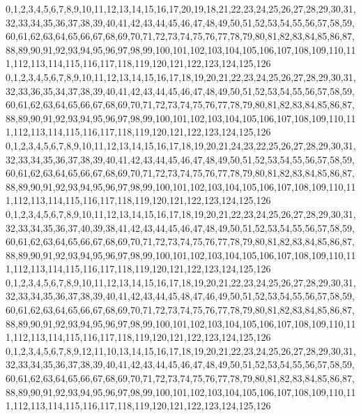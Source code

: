 \documentclass[12pt]{article}
\begin{document}
{0,1,2,3,4,5,6,7,8,9,10,11,12,13,14,15,16,17,20,19,18,21,22,23,24,25,26,27,28,29,30,31,32,33,34,35,36,37,38,39,40,41,42,43,44,45,46,47,48,49,50,51,52,53,54,55,56,57,58,59,60,61,62,63,64,65,66,67,68,69,70,71,72,73,74,75,76,77,78,79,80,81,82,83,84,85,86,87,88,89,90,91,92,93,94,95,96,97,98,99,100,101,102,103,104,105,106,107,108,109,110,111,112,113,114,115,116,117,118,119,120,121,122,123,124,125,126\\
0,1,2,3,4,5,6,7,8,9,10,11,12,13,14,15,16,17,18,19,20,21,22,23,24,25,26,27,28,29,30,31,32,33,36,35,34,37,38,39,40,41,42,43,44,45,46,47,48,49,50,51,52,53,54,55,56,57,58,59,60,61,62,63,64,65,66,67,68,69,70,71,72,73,74,75,76,77,78,79,80,81,82,83,84,85,86,87,88,89,90,91,92,93,94,95,96,97,98,99,100,101,102,103,104,105,106,107,108,109,110,111,112,113,114,115,116,117,118,119,120,121,122,123,124,125,126\\
0,1,2,3,4,5,6,7,8,9,10,11,12,13,14,15,16,17,18,19,20,21,24,23,22,25,26,27,28,29,30,31,32,33,34,35,36,37,38,39,40,41,42,43,44,45,46,47,48,49,50,51,52,53,54,55,56,57,58,59,60,61,62,63,64,65,66,67,68,69,70,71,72,73,74,75,76,77,78,79,80,81,82,83,84,85,86,87,88,89,90,91,92,93,94,95,96,97,98,99,100,101,102,103,104,105,106,107,108,109,110,111,112,113,114,115,116,117,118,119,120,121,122,123,124,125,126\\
0,1,2,3,4,5,6,7,8,9,10,11,12,13,14,15,16,17,18,19,20,21,22,23,24,25,26,27,28,29,30,31,32,33,34,35,36,37,40,39,38,41,42,43,44,45,46,47,48,49,50,51,52,53,54,55,56,57,58,59,60,61,62,63,64,65,66,67,68,69,70,71,72,73,74,75,76,77,78,79,80,81,82,83,84,85,86,87,88,89,90,91,92,93,94,95,96,97,98,99,100,101,102,103,104,105,106,107,108,109,110,111,112,113,114,115,116,117,118,119,120,121,122,123,124,125,126\\
0,1,2,3,4,5,6,7,8,9,10,11,12,13,14,15,16,17,18,19,20,21,22,23,24,25,26,27,28,29,30,31,32,33,34,35,36,37,38,39,40,41,42,43,44,45,48,47,46,49,50,51,52,53,54,55,56,57,58,59,60,61,62,63,64,65,66,67,68,69,70,71,72,73,74,75,76,77,78,79,80,81,82,83,84,85,86,87,88,89,90,91,92,93,94,95,96,97,98,99,100,101,102,103,104,105,106,107,108,109,110,111,112,113,114,115,116,117,118,119,120,121,122,123,124,125,126\\
0,1,2,3,4,5,6,7,8,9,12,11,10,13,14,15,16,17,18,19,20,21,22,23,24,25,26,27,28,29,30,31,32,33,34,35,36,37,38,39,40,41,42,43,44,45,46,47,48,49,50,51,52,53,54,55,56,57,58,59,60,61,62,63,64,65,66,67,68,69,70,71,72,73,74,75,76,77,78,79,80,81,82,83,84,85,86,87,88,89,90,91,92,93,94,95,96,97,98,99,100,101,102,103,104,105,106,107,108,109,110,111,112,113,114,115,116,117,118,119,120,121,122,123,124,125,126\\
}
\end{document}
